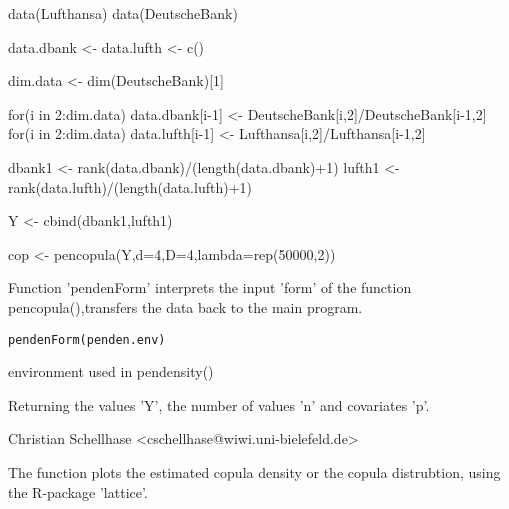 \documentclass[a4paper]{book}
\begin{document}
%
\begin{Examples}
\begin{ExampleCode}

data(Lufthansa)
data(DeutscheBank)

data.dbank <- data.lufth <- c()

dim.data <- dim(DeutscheBank)[1]

for(i in 2:dim.data) data.dbank[i-1] <- DeutscheBank[i,2]/DeutscheBank[i-1,2]
for(i in 2:dim.data) data.lufth[i-1] <- Lufthansa[i,2]/Lufthansa[i-1,2]

dbank1 <- rank(data.dbank)/(length(data.dbank)+1)
lufth1 <- rank(data.lufth)/(length(data.lufth)+1)

Y <- cbind(dbank1,lufth1)

cop <- pencopula(Y,d=4,D=4,lambda=rep(50000,2))

\end{ExampleCode}
\end{Examples}
%
\begin{Description}\relax
Function 'pendenForm' interprets the input 'form' of the function pencopula(),transfers the data back to the main program.
\end{Description}
%
\begin{Usage}
\begin{verbatim}
pendenForm(penden.env)

\end{verbatim}
\end{Usage}
%
\begin{Arguments}
\begin{ldescription}
\item[\code{penden.env}] environment used in pendensity()
\end{ldescription}
\end{Arguments}
%
\begin{Value}
Returning the values 'Y', the number of values 'n' and covariates 'p'.
\end{Value}
%
\begin{Author}\relax
Christian Schellhase <cschellhase@wiwi.uni-bielefeld.de>
\end{Author}
%
\begin{Description}\relax
The function plots the estimated copula density or the
copula distrubtion, using the R-package 'lattice'.
\end{Description}
\end{document}
